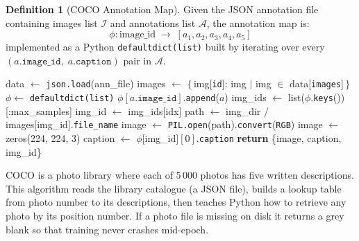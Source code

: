 \documentclass[12pt, a4paper]{article}
\theoremstyle{definition}
\newtheorem{definition}{Definition}[section]
\theoremstyle{plain}
\theoremstyle{remark}
\begin{document}
\begin{definition}[COCO Annotation Map]
Given the JSON annotation file containing images list $\mathcal{I}$ and
annotations list $\mathcal{A}$, the annotation map is:
\[
  \phi : \text{image\_id} \;\longrightarrow\; [a_1, a_2, a_3, a_4, a_5]
\]
implemented as a Python \texttt{defaultdict(list)} built by iterating over
every $(a.\texttt{image\_id},\; a.\texttt{caption})$ pair in $\mathcal{A}$.
\end{definition}

\begin{algorithm}[H]
\caption{COCODataset --- Construction and Item Access}
\label{alg:coco}
\begin{algorithmic}[1]
\Statex
{}
  \State data $\gets$ \texttt{json.load}(ann\_file)
  \State images $\gets$ $\{\,$img[\texttt{id}]: img $\mid$ img $\in$ data[\texttt{images}]$\,\}$
  \State $\phi \gets$ \texttt{defaultdict(list)}
    \State $\phi[a.\texttt{image\_id}]$.\texttt{append}($a$)
  \EndFor
  \State img\_ids $\gets$ list($\phi$.\texttt{keys}())[:max\_samples]
\EndProcedure
\Statex
{}
  \State img\_id $\gets$ img\_ids[idx]
  \State path $\gets$ img\_dir / images[img\_id].\texttt{file\_name}
    \State image $\gets$ \texttt{PIL.open}(path).\texttt{convert}(\texttt{RGB})
  \Else
    \State image $\gets$ zeros(224, 224, 3) 
  \EndIf
  \State caption $\gets$ $\phi[$img\_id$][0]$.\texttt{caption} 
  \State \textbf{return} \{image, caption, img\_id\}
\EndProcedure
\end{algorithmic}
\end{algorithm}

\begin{tcolorbox}[layman]
COCO is a photo library where each of 5\,000 photos has five written
descriptions.  This algorithm reads the library catalogue (a JSON file),
builds a lookup table from photo number to its descriptions, then teaches
Python how to retrieve any photo by its position number.  If a photo file
is missing on disk it returns a grey blank so that training never crashes
mid-epoch.
\end{tcolorbox}
\end{document}
